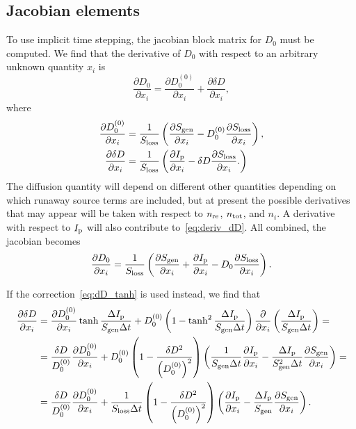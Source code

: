 \documentclass{notes}
\begin{document}
	\subsection{Jacobian elements}
	To use implicit time stepping, the jacobian block matrix for $D_0$ must be
	computed. We find that the derivative of $D_0$ with respect to an arbitrary
	unknown quantity $x_i$ is
	\begin{equation}
		\frac{\partial D_0}{\partial x_i} =
			\frac{\partial D_0^{(0)}}{\partial x_i} +
			\frac{\partial \delta D}{\partial x_i},
	\end{equation}
	where
	\begin{align}
		\frac{\partial D_0^{(0)}}{\partial x_i} &=
			\frac{1}{S_{\rm loss}}\left(
				\frac{\partial S_{\rm gen}}{\partial x_i} -
				D_0^{(0)}
				\frac{\partial S_{\rm loss}}{\partial x_i}
			\right),\\
		\frac{\partial\delta D}{\partial x_i} &=
			\frac{1}{S_{\rm loss}}\left(
				\frac{\partial I_{\rm p}}{\partial x_i}
				- \delta D
				\frac{\partial S_{\rm loss}}{\partial x_i}.
			\right)
		\label{eq:deriv_dD}
	\end{align}
	The diffusion quantity will depend on different other quantities depending
	on which runaway source terms are included, but at present the possible
	derivatives that may appear will be taken with respect to $n_{\rm re}$,
	$n_{\rm tot}$, and $n_i$. A derivative with respect to $I_{\rm p}$ will
	also contribute to~\eqref{eq:deriv_dD}. All combined, the jacobian becomes
	\begin{equation}
		\frac{\partial D_0}{\partial x_i} =
			\frac{1}{S_{\rm loss}}\left(
				\frac{\partial S_{\rm gen}}{\partial x_i} +
				\frac{\partial I_{\rm p}}{\partial x_i} -
				D_0\frac{\partial S_{\rm loss}}{\partial x_i}
			\right).
	\end{equation}

	If the correction~\eqref{eq:dD_tanh} is used instead, we find that
	\begin{equation}
		\begin{aligned}
			\frac{\partial\delta D}{\partial x_i} &=
				\frac{\partial D_0^{(0)}}{\partial x_i}\tanh\frac{\Delta I_{\rm p}}{S_{\rm gen}\Delta t} +
				D_0^{(0)}\left(1-\tanh^2\frac{\Delta I_{\rm p}}{S_{\rm gen}\Delta t}\right)
				\frac{\partial}{\partial x_i}\left(
					\frac{\Delta I_{\rm p}}{S_{\rm gen}\Delta t}
				\right) =\\
			&= \frac{\delta D}{D_0^{(0)}}\frac{\partial D_0^{(0)}}{\partial x_i} +
			D_0^{(0)}\left(1-\frac{\delta D^2}{\left(D_0^{(0)}\right)^2}\right)
			\left(
				\frac{1}{S_{\rm gen}\Delta t}\frac{\partial I_{\rm p}}{\partial x_i} -
				\frac{\Delta I_{\rm p}}{S_{\rm gen}^2\Delta t}\frac{\partial S_{\rm gen}}{\partial x_i}
			\right) =\\
			&= \frac{\delta D}{D_0^{(0)}}\frac{\partial D_0^{(0)}}{\partial x_i} +
			\frac{1}{S_{\rm loss}\Delta t}\left(
				1-\frac{\delta D^2}{\left(D_0^{(0)}\right)^2}
			\right)\left(
				\frac{\partial I_{\rm p}}{\partial x_i} - 
				\frac{\Delta I_{\rm p}}{S_{\rm gen}}
				\frac{\partial S_{\rm gen}}{\partial x_i}
			\right).
		\end{aligned}
	\end{equation}
\end{document}
